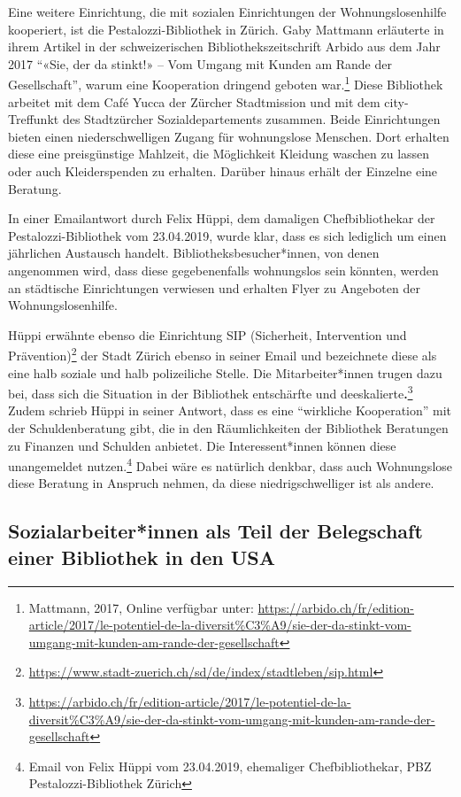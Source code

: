\documentclass[a4paper,
fontsize=11pt,
oneside,
numbers=noperiodatend,
parskip=half-,
bibliography=totoc,
final
]{scrartcl}
\begin{document}
Eine weitere Einrichtung, die mit sozialen Einrichtungen der
Wohnungslosenhilfe kooperiert, ist die Pestalozzi-Bibliothek in Zürich.
Gaby Mattmann erläuterte in ihrem Artikel in der schweizerischen
Bibliothekszeitschrift Arbido aus dem Jahr 2017 \enquote{«Sie, der da
stinkt!» -- Vom Umgang mit Kunden am Rande der Gesellschaft}, warum eine
Kooperation dringend geboten war.\footnote{Mattmann, 2017, Online
  verfügbar unter:
  \url{https://arbido.ch/fr/edition-article/2017/le-potentiel-de-la-diversit\%C3\%A9/sie-der-da-stinkt-vom-umgang-mit-kunden-am-rande-der-gesellschaft}}
Diese Bibliothek arbeitet mit dem Café Yucca der Zürcher Stadtmission
und mit dem city-Treffunkt des Stadtzürcher Sozialdepartements zusammen.
Beide Einrichtungen bieten einen niederschwelligen Zugang für
wohnungslose Menschen. Dort erhalten diese eine preisgünstige Mahlzeit,
die Möglichkeit Kleidung waschen zu lassen oder auch Kleiderspenden zu
erhalten. Darüber hinaus erhält der Einzelne eine Beratung.

In einer Emailantwort durch Felix Hüppi, dem damaligen Chefbibliothekar
der Pestalozzi-Bibliothek vom 23.04.2019, wurde klar, dass es sich
lediglich um einen jährlichen Austausch handelt.
Bibliotheksbesucher*innen, von denen angenommen wird, dass diese
gegebenenfalls wohnungslos sein könnten, werden an städtische
Einrichtungen verwiesen und erhalten Flyer zu Angeboten der
Wohnungslosenhilfe.

Hüppi erwähnte ebenso die Einrichtung SIP (Sicherheit, Intervention und
Prävention)\footnote{\url{https://www.stadt-zuerich.ch/sd/de/index/stadtleben/sip.html}}
der Stadt Zürich ebenso in seiner Email und bezeichnete diese als eine
halb soziale und halb polizeiliche Stelle. Die Mitarbeiter*innen trugen
dazu bei, dass sich die Situation in der Bibliothek entschärfte und
deeskalierte\textbf{.}\footnote{\url{https://arbido.ch/fr/edition-article/2017/le-potentiel-de-la-diversit\%C3\%A9/sie-der-da-stinkt-vom-umgang-mit-kunden-am-rande-der-gesellschaft}}
Zudem schrieb Hüppi in seiner Antwort, dass es eine \enquote{wirkliche
Kooperation} mit der Schuldenberatung gibt, die in den Räumlichkeiten
der Bibliothek Beratungen zu Finanzen und Schulden anbietet. Die
Interessent*innen können diese unangemeldet nutzen.\footnote{Email von
  Felix Hüppi vom 23.04.2019, ehemaliger Chefbibliothekar, PBZ
  Pestalozzi-Bibliothek Zürich} Dabei wäre es natürlich denkbar, dass
auch Wohnungslose diese Beratung in Anspruch nehmen, da diese
niedrigschwelliger ist als andere.

\hypertarget{sozialarbeiterinnen-als-teil-der-belegschaft-einer-bibliothek-in-den-usa}{%
\subsection{Sozialarbeiter*innen als Teil der Belegschaft einer
Bibliothek in den
USA}\label{sozialarbeiterinnen-als-teil-der-belegschaft-einer-bibliothek-in-den-usa}}
\end{document}
